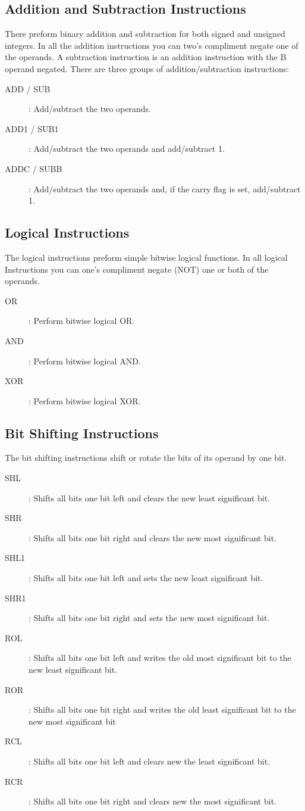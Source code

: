 \documentclass[oneside, a4paper]{memoir}
\begin{document}
\subsection{Addition and Subtraction Instructions}
There preform binary addition and subtraction for both signed and unsigned integers. In all the addition instructions you can two's compliment negate one of the operands. A subtraction instruction is an addition instruction with the B operand negated. There are three groups of addition/subtraction instructions:
\begin{description}
\item[ADD / SUB]: Add/subtract the two operands.
\item[ADD1 / SUB1]: Add/subtract the two operands and add/subtract 1.
\item[ADDC / SUBB]: Add/subtract the two operands and, if the carry flag is set, add/subtract 1.
\end{description}
\subsection{Logical Instructions}
The logical instructions preform simple bitwise logical functions. In all logical Instructions you can one's compliment negate (NOT) one or both of the operands.
\begin{description}
\item[OR]: Perform bitwise logical OR.
\item[AND]: Perform bitwise logical AND.
\item[XOR]: Perform bitwise logical XOR.
\end{description}
\subsection{Bit Shifting Instructions}
The bit shifting instructions shift or rotate the bits of its operand by one bit.
\begin{description}
\item[SHL]: Shifts all bits one bit left and clears the new least significant bit.
\item[SHR]: Shifts all bits one bit right and clears the new most significant bit.
\item[SHL1]: Shifts all bits one bit left and sets the new least significant bit.
\item[SHR1]: Shifts all bits one bit right and sets the new most significant bit.
\item[ROL]: Shifts all bits one bit left and writes the old most significant bit to the new least significant bit.
\item[ROR]: Shifts all bits one bit right and writes the old least significant bit to the new most significant bit
\item[RCL]: Shifts all bits one bit left and clears new the least significant bit.
\item[RCR]: Shifts all bits one bit right and clears new the most significant bit.
\end{description}
\end{document}
